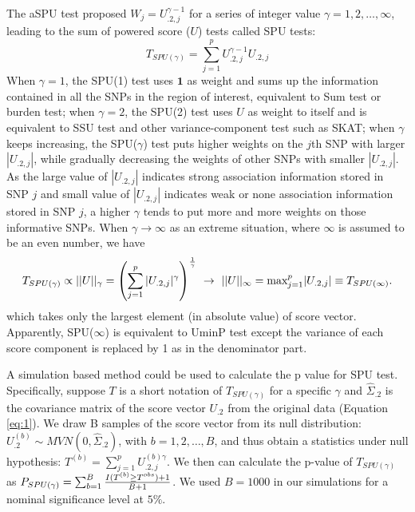 \documentclass[12pt]{article}
\begin{document}
The aSPU test proposed
$W_j = U_{.2, j} ^ { \gamma - 1}$
for a series of integer value $\gamma = 1,2,\ldots,\infty$, leading to the sum of powered score ($U$) tests called SPU tests:
$$
T_{ SPU ( \gamma ) } = \sum_{j=1}^p U_{.2, j} ^ { \gamma - 1} U_{.2, j}
$$
When $\gamma = 1$, the SPU(1) test uses $\textbf{1}$ as weight and sums up the information contained in all the SNPs in the region of interest, equivalent to Sum test or burden test; when $\gamma = 2$, the SPU(2) test uses $U$ as weight to itself and is equivalent to SSU test and other variance-component test such as SKAT; when $\gamma$ keeps increasing, the SPU($\gamma$) test puts higher weights on the $j$th SNP with larger $|U_{.2,j}|$, while gradually decreasing the weights of other SNPs with smaller $|U_{.2,j}|$. As the large value of $|U_{.2,j}|$ indicates strong association information stored in SNP $j$ and small value of $|U_{.2,j}|$ indicates weak or none association information stored in SNP $j$, a higher $\gamma$ tends to put more and more weights on those informative SNPs. When $\gamma \rightarrow \infty$ as an extreme situation, where $\infty$ is assumed to be an even number, we have
$$
T_{ SPU(\gamma) } \propto ||U||_{\gamma} = \left( \sum_{j=1}^p |U_{.2, j}| ^ { \gamma } \right) ^ { 1 \over \gamma } \ \rightarrow \ ||U||_{\infty} = \textrm{max}_{j=1} ^ p |U_{.2, j}| \equiv T_{ SPU(\infty) }.
$$ 
which takes only the largest element (in absolute value) of score vector. Apparently, SPU($\infty$) is equivalent to UminP test except the variance of each score component is replaced by 1 as in the denominator part.

A simulation based method \cite{Lin2005,Seaman2005} could be used to calculate the p value for SPU test. Specifically, suppose $T$ is a short notation of $T_{ SPU(\gamma) }$ for a specific $\gamma$ and $\hat{\Sigma}_{.2}$ is the covariance matrix of the score vector $U_{.2}$ from the original data (Equation \ref{eq:1}). We draw B samples of the score vector from its null distribution: $U_{.2}^{ (b) } \sim MVN \left( 0, \hat{\Sigma}_{.2} \right)$, with $b = 1,2,\ldots,B$, and thus obtain a statistics under null hypothesis: $T ^ {(b)} = \sum_{j=1}^p U^{ (b)\gamma }_{.2, j} $. We then can calculate the p-value of $T_{ SPU(\gamma) }$ as $P_{ SPU(\gamma) } = \sum_{b=1}^B { I(T^{(b)} \geq T ^ {obs} ) + 1  \over B + 1 } $. We used $B = 1000$ in our simulations for a nominal significance level at $5\%$. 
\end{document}
